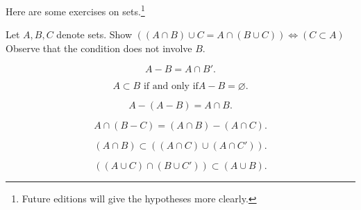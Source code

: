 

Here are some exercises on sets.\footnote{Future editions will give the hypotheses more clearly.}

\begin{exercise}
Let $A, B, C$ denote sets.
Show $((A \cap B) \cup C = A \cap (B \cup C)) \iff (C \subset A)$
Observe that the condition does not involve $B$.
\end{exercise}

\begin{exercise}
\[
  A - B = A \cap B'.
\]
\end{exercise}
\begin{exercise}
\[
  A \subset B \text{ if and only if} A - B = \varnothing.
\]
\end{exercise}
\begin{exercise}
\[
  A - (A - B) = A \cap B.
\]
\end{exercise}
\begin{exercise}
\[
  A \cap (B - C) = (A \cap B) - (A \cap C).
\]
\end{exercise}
\begin{exercise}
\[
  (A \cap B) \subset ((A \cap C) \cup (A \cap C')).
\]
\end{exercise}
\begin{exercise}
\[
  ((A \cup C) \cap (B \cup C')) \subset (A \cup B).
\]
\end{exercise}

